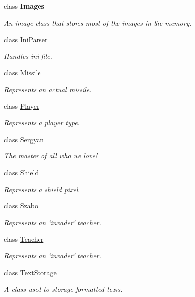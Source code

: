 \begin{DoxyCompactItemize}
class {\bfseries Images}
\begin{DoxyCompactList}\small\item\em An image class that stores most of the images in the memory. \end{DoxyCompactList}\item 
class \mbox{\hyperlink{class_o_e_invaders_1_1_library_1_1_ini_parser}{Ini\+Parser}}
\begin{DoxyCompactList}\small\item\em Handles ini file. \end{DoxyCompactList}\item 
class \mbox{\hyperlink{class_o_e_invaders_1_1_library_1_1_missile}{Missile}}
\begin{DoxyCompactList}\small\item\em Represents an actual missile. \end{DoxyCompactList}\item 
class \mbox{\hyperlink{class_o_e_invaders_1_1_library_1_1_player}{Player}}
\begin{DoxyCompactList}\small\item\em Represents a player type. \end{DoxyCompactList}\item 
class \mbox{\hyperlink{class_o_e_invaders_1_1_library_1_1_sergyan}{Sergyan}}
\begin{DoxyCompactList}\small\item\em The master of all who we love! \end{DoxyCompactList}\item 
class \mbox{\hyperlink{class_o_e_invaders_1_1_library_1_1_shield}{Shield}}
\begin{DoxyCompactList}\small\item\em Represents a shield pixel. \end{DoxyCompactList}\item 
class \mbox{\hyperlink{class_o_e_invaders_1_1_library_1_1_szabo}{Szabo}}
\begin{DoxyCompactList}\small\item\em Represents an \char`\"{}invader\char`\"{} teacher. \end{DoxyCompactList}\item 
class \mbox{\hyperlink{class_o_e_invaders_1_1_library_1_1_teacher}{Teacher}}
\begin{DoxyCompactList}\small\item\em Represents an \char`\"{}invader\char`\"{} teacher. \end{DoxyCompactList}\item 
class \mbox{\hyperlink{class_o_e_invaders_1_1_library_1_1_text_storage}{Text\+Storage}}
\begin{DoxyCompactList}\small\item\em A class used to storage formatted texts. \end{DoxyCompactList}\end{DoxyCompactItemize}
